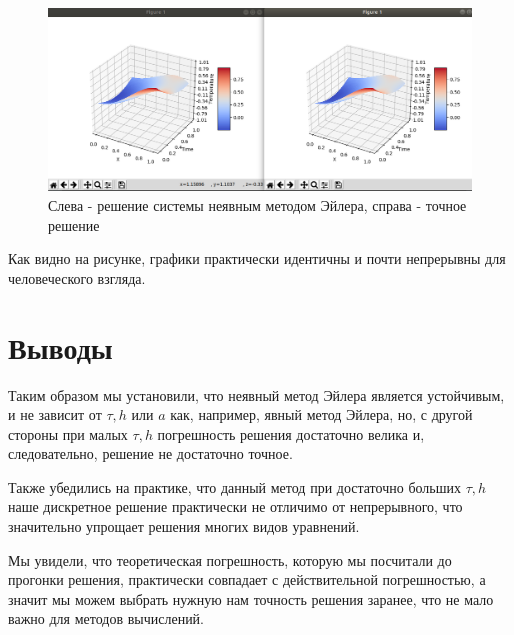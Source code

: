 \documentclass[12pt,a4paper]{scrartcl}
\begin{document}
\begin{figure}[h!]
    \centering
    \includegraphics[width=14cm]{heat_equation_implicit_Euler/images/t500h500.png}
    \caption{Слева - решение системы неявным методом Эйлера,
                справа - точное решение}
\end{figure}

Как видно на рисунке, графики практически идентичны и почти непрерывны для человеческого взгляда.

\section{Выводы}

Таким образом мы установили, что неявный метод Эйлера является устойчивым, и не зависит от $\tau,h$ или $a$ как, например, явный метод Эйлера, но, с другой стороны при малых $\tau, h$ погрешность решения достаточно велика и, следовательно, решение не достаточно точное.

Также убедились на практике, что данный метод при достаточно больших $\tau, h$ наше дискретное решение практически не отличимо от непрерывного, что значительно упрощает решения многих видов уравнений.

Мы увидели, что теоретическая погрешность, которую мы посчитали до прогонки решения, практически совпадает с действительной погрешностью, а значит мы можем выбрать нужную нам точность решения заранее, что не мало важно для методов вычислений.
\end{document}
